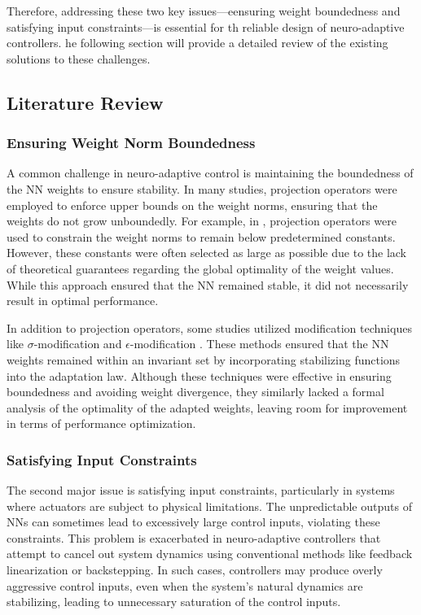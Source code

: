\documentclass[lettersize,journal]{IEEEtran}
\begin{document}
Therefore, addressing these two key issues—eensuring weight boundedness and satisfying input constraints—is essential for th reliable design of neuro-adaptive controllers. 
he following section will provide a detailed review of the existing solutions to these challenges.

\subsection{Literature Review}

\subsubsection{Ensuring Weight Norm Boundedness}

A common challenge in neuro-adaptive control is maintaining the boundedness of the NN weights to ensure stability. 
In many studies, projection operators were employed to enforce upper bounds on the weight norms, ensuring that the weights do not grow unboundedly. 
For example, in \cite{Zhou:2023aa,Griffis:2023aa,Patil:2022aa}, projection operators were used to constrain the weight norms to remain below predetermined constants. 
However, these constants were often selected as large as possible due to the lack of theoretical guarantees regarding the global optimality of the weight values. 
While this approach ensured that the NN remained stable, it did not necessarily result in optimal performance.

In addition to projection operators, some studies utilized modification techniques like $\sigma$-modification \cite{Ge:2002aa} and $\epsilon$-modification \cite{Esfandiari:2015aa,Gao:2006aa}. 
These methods ensured that the NN weights remained within an invariant set by incorporating stabilizing functions into the adaptation law. 
Although these techniques were effective in ensuring boundedness and avoiding weight divergence, they similarly lacked a formal analysis of the optimality of the adapted weights, leaving room for improvement in terms of performance optimization.

\subsubsection{Satisfying Input Constraints}

The second major issue is satisfying input constraints, particularly in systems where actuators are subject to physical limitations. 
The unpredictable outputs of NNs can sometimes lead to excessively large control inputs, violating these constraints. 
This problem is exacerbated in neuro-adaptive controllers that attempt to cancel out system dynamics using conventional methods like feedback linearization or backstepping. 
In such cases, controllers may produce overly aggressive control inputs, even when the system's natural dynamics are stabilizing, leading to unnecessary saturation of the control inputs.
\end{document}
